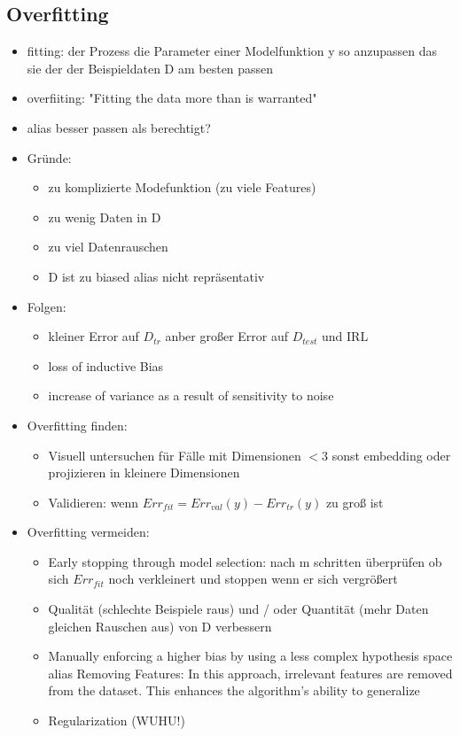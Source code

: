 \documentclass[11pt,a4paper]{article}
\begin{document}
\begin{flushleft}
\subsection{Overfitting}
\begin{itemize}
\item fitting: der Prozess die Parameter einer Modelfunktion y so anzupassen das sie der der Beispieldaten D am besten passen
\item overfiiting: "Fitting the data more than is warranted"
\item alias besser passen als berechtigt?
\item Gründe:
	\begin{itemize}
	\item zu komplizierte Modefunktion (zu viele Features) 
	\item zu wenig Daten in D
	\item zu viel Datenrauschen
	\item D ist zu biased alias nicht repräsentativ 
	\end{itemize}
\item Folgen:
	\begin{itemize}
	\item kleiner Error auf $D_{tr}$ anber großer Error auf $D_{test}$ und IRL
	\item loss of inductive Bias
	\item increase of variance as a result of sensitivity to noise
	\end{itemize}
\item Overfitting finden: 
	\begin{itemize}
	\item Visuell untersuchen für Fälle mit Dimensionen $<3$ sonst embedding oder 		projizieren  in kleinere Dimensionen
	\item Validieren: wenn $Err_{fit} = Err_{val}(y) - Err_{tr}(y)$ zu groß ist
	\end{itemize}
\item Overfitting vermeiden:
	\begin{itemize}
	\item Early stopping through model selection: nach m schritten überprüfen ob sich $ Err_{fit}$ noch verkleinert und stoppen wenn er sich vergrößert
	\item Qualität (schlechte Beispiele raus) und / oder Quantität (mehr Daten gleichen Rauschen aus) von D verbessern
	\item Manually enforcing a higher bias by using a less complex hypothesis space alias Removing Features: In this approach, irrelevant features are removed from the dataset.
This enhances the algorithm’s ability to generalize
	\item Regularization (WUHU!)
	\end{itemize}
\end{itemize}

\end{flushleft}
\end{document}
